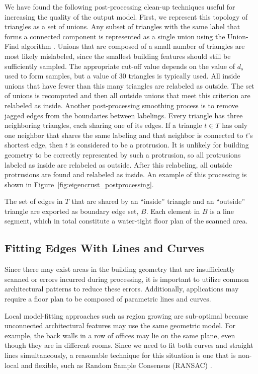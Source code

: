 \documentclass[10pt,twocolumn,letterpaper]{article}
\begin{document}
We have found the following post-processing clean-up techniques useful for increasing the quality of the output model.  First, we represent this topology of triangles as a set of unions.  Any subset of triangles with the same label that forms a connected component is represented as a single union using the Union-Find algorithm \cite{Unionfind}.  Unions that are composed of a small number of triangles are most likely mislabeled, since the smallest building features should still be sufficiently sampled.  The appropriate cut-off value depends on the value of $d_s$ used to form samples, but a value of 30 triangles is typically used.  All inside unions that have fewer than this many triangles are relabeled as outside. The set of unions is recomputed and then all outside unions that meet this criterion are relabeled as inside. Another post-processing smoothing process is to remove jagged edges from the boundaries between labelings.  Every triangle has three neighboring triangles, each sharing one of its edges.  If a triangle $t \in T$ has only one neighbor that shares the same labeling and that neighbor is connected to $t$'s shortest edge, then $t$ is considered to be a protrusion.  It is unlikely for building geometry to be correctly represented by such a protrusion, so all protrusions labeled as inside are relabeled as outside. After this relabeling, all outside protrusions are found and relabeled as inside.  An example of this processing is shown in Figure~\ref{fig:eigencrust_postprocessing}.

The set of edges in $T$ that are shared by an ``inside'' triangle and an ``outside'' triangle are exported as boundary edge set, $B$.  Each element in $B$ is a line segment, which in total constitute a water-tight floor plan of the scanned area.

\subsection{Fitting Edges With Lines and Curves}
\label{sec:fitting}

Since there may exist areas in the building geometry that are insufficiently scanned or errors incurred during processing, it is important to utilize common architectural patterns to reduce these errors.  Additionally, applications may require a floor plan to be composed of parametric lines and curves.

Local model-fitting approaches such as region growing are sub-optimal because unconnected architectural features may use the same geometric model.  For example, the back walls in a row of offices may lie on the same plane, even though they are in different rooms. Since we need to fit both curves and straight lines simultaneously, a reasonable technique for this situation is one that is non-local and flexible, such as Random Sample Consensus (RANSAC) \cite{Ransac}.
\end{document}
